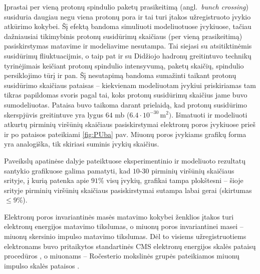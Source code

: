 \documentclass[a4paper, 12pt, twoside]{article}
\newlength\q
\begin{document}
Įprastai per vieną protonų spindulio paketų prasikeitimą (angl.\ \textit{bunch crossing}) susiduria
daugiau negu viena protonų pora ir tai turi įtakos užregistruoto įvykio atkūrimo kokybei.
Šį efektą bandoma simuliuoti modeliuotuose įvykiuose, tačiau dažniausiai tikimybinis protonų susidūrimų
skaičiaus (per vieną prasikeitimą) pasiskirstymas matavime ir modeliavime nesutampa.
Tai siejasi su atsitiktinėmis susidūrimų fliuktuacijmis, o taip pat ir su Didžiojo hadronų greitintuvo
technikų tyrinėjimais keičiant protonų spindulio intensyvumą, paketų skaičių, spindulio persiklojimo
tūrį ir pan.
Šį nesutapimą bandoma sumažinti taikant protonų susidūrimo skaičiaus pataisas -- kiekvienam modeliuotam
įvykiui priskiriamas tam tikras papildomas svoris pagal tai, koks protonų susidūrimų skaičius jame buvo sumodeliuotas.
Pataisa buvo taikoma darant prielaidą, kad protonų susidūrimo skerspjūvis greitintuve yra lygus $64$ mb
($6.4 \cdot 10^{-30} \, \mathrm{m}^2)$.
Išmatuoti ir modeliuoti atkurtų pirminių viršūnių skaičiaus pasiskirstymai elektronų poros įvykiuose
prieš ir po pataisos pateikiami \ref{fig:PUba} pav.
Miuonų poros įvykiams grafikų forma yra analogiška, tik skiriasi suminis įvykių skaičius.

Paveikslų apatinėse dalyje pateiktuose eksperimentinio ir modeliuoto rezultatų santykio grafikuose galima pamatyti, kad
$10$-$30$ pirminių viršūnių skaičiaus srityje, į kurią patenka apie $91\%$ visų įvykių, grafikai tampa plokštesni --
šioje srityje pirminių viršūnių skaičiaus pasiskirstymai sutampa labai gerai (skirtumas $\leqslant 9\%$).

Elektronų poros invariantinės masės matavimo kokybei ženklios įtakos turi elektronų energijos matavimo
tikslumas, o miuonų poros invariantinei masei -- miuonų skersinio impulso matavimo tikslumas.
Dėl to visiems užregistruotiems elektronams buvo pritaikytos standartinės CMS elektronų energijos skalės
pataisų procedūros \cite{Ecorr}, o miuonams -- Ročesterio mokslinės grupės pateikiamos miuonų impulso
skalės pataisos \cite{RocCorr}.
\end{document}
